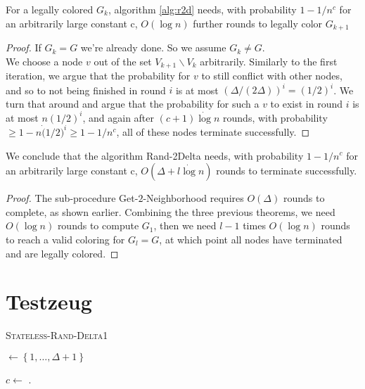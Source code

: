 \begin{theorem}
\label{theorem:r2diteration}
	For a legally colored $G_k$, algorithm \ref{alg:r2d} needs, with probability $1-1/n^c$ for an arbitrarily large constant c, $O(\log n)$ further rounds to legally color $G_{k+1}$
\end{theorem}
\begin{proof}
	If $G_k = G$ we're already done.
	So we assume $G_k \neq G$.\\
	We choose a node $v$ out of the set $V_{k+1}\backslash V_k$ arbitrarily. Similarly to the first iteration, we argue that the probability for $v$ to still conflict with other nodes, and so to not being finished in round $i$ is at most $(\Delta /(2\Delta))^i = (1/2)^i$. We turn that around and argue that the probability for such a $v$ to exist in round $i$ is at most $n (1/2)^i$, and again after $(c+1) \dot \log n$ rounds, with probability $\geq 1-n \dot (1/2)^i \geq 1-1/n^c$, all of these nodes terminate successfully.
\end{proof}

\begin{theorem}
\label{theorem:r2dkomplett}
	We conclude that the algorithm Rand-2Delta needs, with probability $1-1/n^c$ for an arbitrarily large constant c, $O(\Delta + l \dot \log n)$ rounds to terminate successfully.
\end{theorem}
\begin{proof}
	The sub-procedure Get-$2$-Neighborhood requires $O(\Delta)$ rounds to complete, as shown earlier. Combining the three previous theorems, we need $O(\log n)$ rounds to compute $G_1$, then we need $l-1$ times $O(\log n)$ rounds to reach a valid coloring for $G_l = G$, at which point all nodes have terminated and are legally colored.
\end{proof}

\section{Testzeug}

\begin{algorithm}[bt]
\caption{\textsc{Stateless-Rand-Delta1}}\label{alg:algsrd1}
\DontPrintSemicolon 






\C 
$
\leftarrow 
\left\{ 
1, \dots , \Delta + 1 
\right\} 
$ 
\;


$c 
\leftarrow 
$
\C.\randcolor{} 
\;







\end{algorithm}

